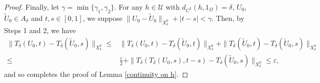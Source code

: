 \documentclass[11pt]{amsart}
\begin{document}
\begin{proof}
Finally, let $\gamma =\min\{ \gamma_1 , \gamma_2\}$. For any $h \in \mathcal{U}$ with  $d_{C^2}(h,1_{\Omega})=\delta$, $U_{0}$, $\tilde{U}_{0} \in A_{{\delta}}$ and $t, s \in[0,1]$, we suppose $\|U_{0}-\tilde{U}_{0}\|_{X^0_{\delta}}+|t-s|<\gamma$. Then, by Steps 1 and 2, we have
\begin{align*}
\|T_{{\delta}}\left(U_{0}, t\right)-T_{{\delta}}(\tilde{U}_{0}, s)\|_{X^0_{{\delta}}} \leq & \|T_{{\delta}}\left(U_{0}, t\right)-T_{{\delta}}(\tilde{U}_{0}, t)\|_{X^0_{{\delta}}} +\|T_{{\delta}}(\tilde{U}_{0}, t)-T_{{\delta}}(\tilde{U}_{0}, s)\|_{X^0_{{\delta}}} \\
\leq & \frac{\varepsilon}{2}+\|T_{{\delta}}\left(T_{{\delta}}\left(U_{0}, s\right), t-s\right)-T_{{\delta}}(\tilde{U}_{0}, s)\|_{X^0_{{\delta}}} \leq \varepsilon,
\end{align*}
and so completes the proof of Lemma \ref{continuity on h}.
\end{proof}
\noindent
\end{document}
